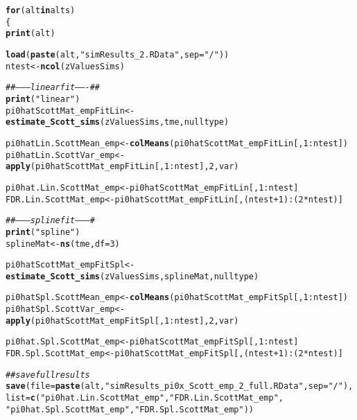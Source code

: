 \documentclass{article}\usepackage[]{graphicx}\usepackage[]{color}
\makeatletter
\newcommand{\hlnum}[1]{\textcolor[rgb]{0.686,0.059,0.569}{#1}}%
\newcommand{\hlstr}[1]{\textcolor[rgb]{0.192,0.494,0.8}{#1}}%
\newcommand{\hlcom}[1]{\textcolor[rgb]{0.678,0.584,0.686}{\textit{#1}}}%
\newcommand{\hlopt}[1]{\textcolor[rgb]{0,0,0}{#1}}%
\newcommand{\hlstd}[1]{\textcolor[rgb]{0.345,0.345,0.345}{#1}}%
\newcommand{\hlkwa}[1]{\textcolor[rgb]{0.161,0.373,0.58}{\textbf{#1}}}%
\newcommand{\hlkwb}[1]{\textcolor[rgb]{0.69,0.353,0.396}{#1}}%
\newcommand{\hlkwc}[1]{\textcolor[rgb]{0.333,0.667,0.333}{#1}}%
\newcommand{\hlkwd}[1]{\textcolor[rgb]{0.737,0.353,0.396}{\textbf{#1}}}%
\newenvironment{kframe}{%
 \def\at@end@of@kframe{}%
 \ifinner\ifhmode%
  \def\at@end@of@kframe{\end{minipage}}%
  \begin{minipage}{\columnwidth}%
 \fi\fi%
 \def\FrameCommand##1{\hskip\@totalleftmargin \hskip-\fboxsep
 \colorbox{shadecolor}{##1}\hskip-\fboxsep
     \hskip-\linewidth \hskip-\@totalleftmargin \hskip\columnwidth}%
 \MakeFramed {\advance\hsize-\width
   \@totalleftmargin\z@ \linewidth\hsize
   \@setminipage}}%
 {\par\unskip\endMakeFramed%
 \at@end@of@kframe}
\newenvironment{knitrout}{}{} %
\makeatother
\begin{document}
\begin{knitrout}
\color{fgcolor}\begin{kframe}
\begin{alltt}
\hlkwa{for}\hlstd{(alt} \hlkwa{in} \hlstd{alts)}
\hlstd{\{}
  \hlkwd{print}\hlstd{(alt)}

  \hlkwd{load}\hlstd{(}\hlkwd{paste}\hlstd{(alt,}\hlstr{"simResults_2.RData"}\hlstd{,}\hlkwc{sep}\hlstd{=}\hlstr{"/"}\hlstd{))}
  \hlstd{ntest} \hlkwb{<-} \hlkwd{ncol}\hlstd{(zValuesSims)}

  \hlcom{##--------linear fit-------##}
  \hlkwd{print}\hlstd{(}\hlstr{"linear"}\hlstd{)}
  \hlstd{pi0hatScottMat_empFitLin} \hlkwb{<-} \hlkwd{estimate_Scott_sims}\hlstd{(zValuesSims, tme, nulltype)}

  \hlstd{pi0hatLin.ScottMean_emp} \hlkwb{<-} \hlkwd{colMeans}\hlstd{(pi0hatScottMat_empFitLin[,}\hlnum{1}\hlopt{:}\hlstd{ntest])}
  \hlstd{pi0hatLin.ScottVar_emp} \hlkwb{<-} \hlkwd{apply}\hlstd{(pi0hatScottMat_empFitLin[,}\hlnum{1}\hlopt{:}\hlstd{ntest],}\hlnum{2}\hlstd{,var)}

  \hlstd{pi0hat.Lin.ScottMat_emp} \hlkwb{<-} \hlstd{pi0hatScottMat_empFitLin[,}\hlnum{1}\hlopt{:}\hlstd{ntest]}
  \hlstd{FDR.Lin.ScottMat_emp} \hlkwb{<-} \hlstd{pi0hatScottMat_empFitLin[,(ntest}\hlopt{+}\hlnum{1}\hlstd{)}\hlopt{:}\hlstd{(}\hlnum{2}\hlopt{*}\hlstd{ntest)]}

  \hlcom{##---------spline fit---------#}
  \hlkwd{print}\hlstd{(}\hlstr{"spline"}\hlstd{)}
  \hlstd{splineMat} \hlkwb{<-} \hlkwd{ns}\hlstd{(tme,}\hlkwc{df}\hlstd{=}\hlnum{3}\hlstd{)}

  \hlstd{pi0hatScottMat_empFitSpl} \hlkwb{<-} \hlkwd{estimate_Scott_sims}\hlstd{(zValuesSims, splineMat, nulltype)}

  \hlstd{pi0hatSpl.ScottMean_emp} \hlkwb{<-} \hlkwd{colMeans}\hlstd{(pi0hatScottMat_empFitSpl[,}\hlnum{1}\hlopt{:}\hlstd{ntest])}
  \hlstd{pi0hatSpl.ScottVar_emp} \hlkwb{<-} \hlkwd{apply}\hlstd{(pi0hatScottMat_empFitSpl[,}\hlnum{1}\hlopt{:}\hlstd{ntest],}\hlnum{2}\hlstd{,var)}

  \hlstd{pi0hat.Spl.ScottMat_emp} \hlkwb{<-} \hlstd{pi0hatScottMat_empFitSpl[,}\hlnum{1}\hlopt{:}\hlstd{ntest]}
  \hlstd{FDR.Spl.ScottMat_emp} \hlkwb{<-} \hlstd{pi0hatScottMat_empFitSpl[,(ntest}\hlopt{+}\hlnum{1}\hlstd{)}\hlopt{:}\hlstd{(}\hlnum{2}\hlopt{*}\hlstd{ntest)]}

  \hlcom{##save full results}
  \hlkwd{save}\hlstd{(}\hlkwc{file}\hlstd{=}\hlkwd{paste}\hlstd{(alt,}\hlstr{"simResults_pi0x_Scott_emp_2_full.RData"}\hlstd{,}\hlkwc{sep}\hlstd{=}\hlstr{"/"}\hlstd{),}
       \hlkwc{list}\hlstd{=}\hlkwd{c}\hlstd{(}\hlstr{"pi0hat.Lin.ScottMat_emp"}\hlstd{,} \hlstr{"FDR.Lin.ScottMat_emp"}\hlstd{,}
              \hlstr{"pi0hat.Spl.ScottMat_emp"}\hlstd{,} \hlstr{"FDR.Spl.ScottMat_emp"}\hlstd{))}


\end{alltt}
\end{kframe}
\end{knitrout}
\end{document}
